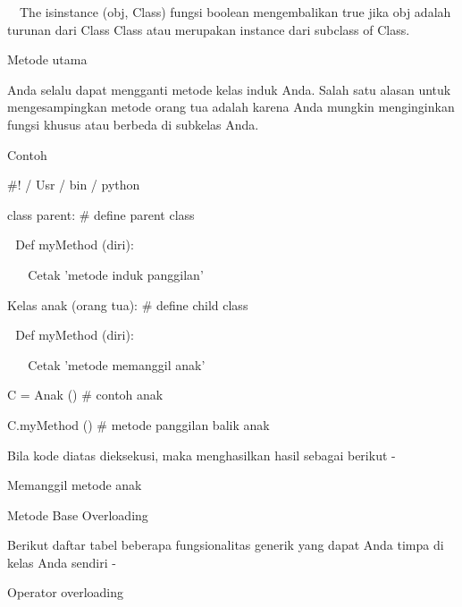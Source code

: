 \documentclass[a4paper,12pt]{report}
\begin{document}
\noindent 
 $  $ $  $ $  $ $  $The isinstance (obj, Class) fungsi boolean mengembalikan true jika obj adalah turunan dari Class Class atau merupakan instance dari subclass of Class. \par
\vspace{12pt}
\noindent 
Metode utama \par
\vspace{12pt}
\noindent 
Anda selalu dapat mengganti metode kelas induk Anda. Salah satu alasan untuk mengesampingkan metode orang tua adalah karena Anda mungkin menginginkan fungsi khusus atau berbeda di subkelas Anda. \par
\noindent 
Contoh \par
\vspace{12pt}
\noindent 
 $  \#  $! / Usr / bin / python \par
\vspace{12pt}
\noindent 
class parent:  $  \#  $ define parent class \par
\noindent 
 $  $ $  $ $  $Def myMethod (diri): \par
\noindent 
 $  $ $  $ $  $ $  $ $  $ $  $Cetak 'metode induk panggilan' \par
\vspace{12pt}
\noindent 
Kelas anak (orang tua):  $  \#  $ define child class \par
\noindent 
 $  $ $  $ $  $Def myMethod (diri): \par
\noindent 
 $  $ $  $ $  $ $  $ $  $ $  $Cetak 'metode memanggil anak' \par
\vspace{12pt}
\noindent 
C = Anak ()  $  \#  $ contoh anak \par
\noindent 
C.myMethod ()  $  \#  $ metode panggilan balik anak \par
\vspace{12pt}
\noindent 
Bila kode diatas dieksekusi, maka menghasilkan hasil sebagai berikut - \par
\vspace{12pt}
\noindent 
Memanggil metode anak \par
\vspace{12pt}
\noindent 
Metode Base Overloading \par
\vspace{12pt}
\noindent 
Berikut daftar tabel beberapa fungsionalitas generik yang dapat Anda timpa di kelas Anda sendiri - \par
\vspace{12pt}
\noindent 
Operator overloading \par
\end{document}
